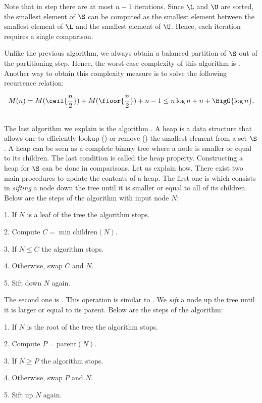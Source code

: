 Note that in step  there are at most \(n - 1\) iterations. Since \(\L\)
and \(\U\) are sorted, the smallest element of \(\S\) can be computed as the
smallest element between the smallest element of \(\L\) and the smallest
element of \(\U\). Hence, each iteration requires a single comparison.

Unlike the previous algorithm, we always obtain a balanced partition of
\(\S\) out of the partitioning step. Hence, the worst-case complexity of this
algorithm is . Another way to obtain this complexity measure
is to solve the following recurrence relation:

\begin{displaymath}
M(n) = M(\ceil{\frac{n}{2}}) + M(\floor{\frac{n}{2}}) + n - 1 \le n \log n +
n + \BigO{\log n}.
\end{displaymath}

\subsection{\heapsort}
The last algorithm we explain is the \heapsort algorithm
\cite{williams:1964}. A heap is a data structure that allows one to
efficiently lookup () or remove () the smallest element
from a set \(\S\). A heap can be seen as a complete binary tree where a node
is smaller or equal to its children. The last condition is called the heap property.
Constructing a heap for \(\S\) can be done in  comparisons.  Let us
explain how. There exist two main procedures to update the contents of a heap.
The first one is \siftdown which consists in \emph{sifting} a node down
the tree until it is smaller or equal to all of its children. Below are the
steps of the \siftdown algorithm with input node \(N\):
\begin{algorithm}[\siftdown]
\item[1.] If \(N\) is a leaf of the tree the algorithm stops.
\item[2.] Compute \(C = \min \text{children}(N)\).
\item[3.] If \(N \le C\) the algorithm stops.
\item[4.] Otherwise, swap \(C\) and \(N\).
\item[5.] Sift down \(N\) again.
\end{algorithm}

The second one is \siftup. This operation is similar to \siftdown.
We \emph{sift} a node up the tree until it is larger or equal to its parent.
Below are the steps of the algorithm:
\begin{algorithm}[\siftup]
\item[1.] If \(N\) is the root of the tree the algorithm stops.
\item[2.] Compute \(P = \text{parent}(N)\).
\item[3.] If \(N \ge P\) the algorithm stops.
\item[4.] Otherwise, swap \(P\) and \(N\).
\item[5.] Sift up \(N\) again.
\end{algorithm}

